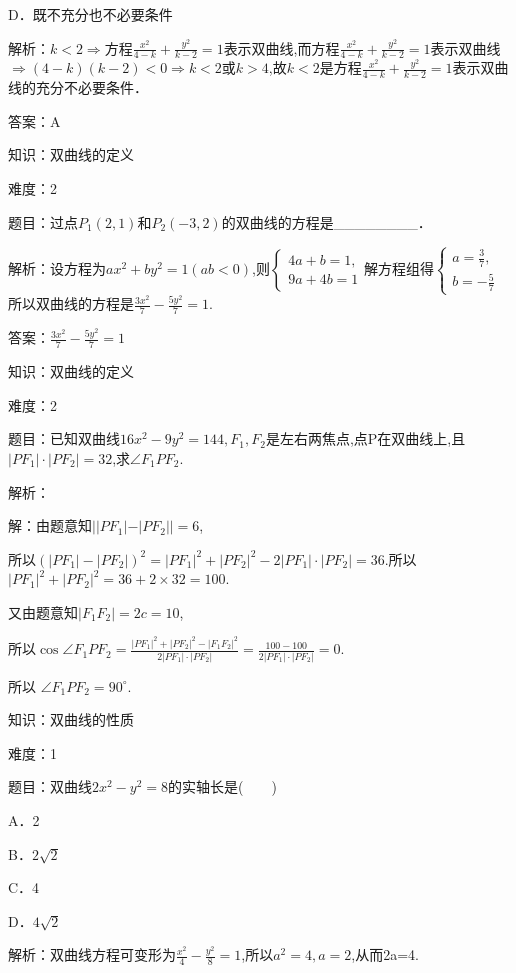 \documentclass{article} %
\begin{document}
D．既不充分也不必要条件

解析：$k<2 \Rightarrow $方程$\frac{x^2}{4-k}+\frac{y^2}{k-2}=1$表示双曲线,而方程$\frac{x^2}{4-k}+\frac{y^2}{k-2}=1$表示双曲线$\Rightarrow (4-k)(k-2)<0 \Rightarrow k<2$或$k>4$,故$k<2$是方程$\frac{x^2}{4-k}+\frac{y^2}{k-2}=1$表示双曲线的充分不必要条件．

答案：A



知识：双曲线的定义

难度：2

题目：过点$P_{1}(2,1)$和$P_{2}(-3,2)$的双曲线的方程是\_\_\_\_\_\_\_\_．

解析：设方程为$ax^{2}+by^{2}=1(ab<0)$,则$\left\{
\begin{array}{l}
4a+b=1, \\
9a+4b=1
\end{array}
\right.$解方程组得$\left\{
\begin{array}{l}
a=\frac{3}{7}, \\
b=-\frac{5}{7}
\end{array}
\right.$所以双曲线的方程是$\frac{3x^2}{7}-\frac{5y^2}{7}=1$.

答案：$\frac{3x^2}{7}-\frac{5y^2}{7}=1$

知识：双曲线的定义

难度：2

题目：已知双曲线$16x^{2}-9y^{2}=144,F_{1},F_{2}$是左右两焦点,点P在双曲线上,且$|PF_1|\cdot |PF_2|=32$,求${\angle}F_{1}PF_{2}$.

解析：

解：由题意知$||PF_1|-|PF_2||=6$,

所以$(|PF_1|-|PF_2|)^2=|PF_1|^2+|PF_2|^2-2|PF_1|\cdot |PF_2|=36$.所以$|PF_1|^2+|PF_2|^2=36+2\times 32=100$.

又由题意知$|F_1F_2|=2c=10$,

所以$\cos \angle F_1PF_2 =\frac{|PF_1|^2+|PF_2|^2-|F_1F_2|^2}{2|PF_1|\cdot |PF_2|}=\frac{100-100}{2|PF_1|\cdot |PF_2|}=0$.

所以 ${\angle}F_{1}PF_{2}=90^{\circ}$.



知识：双曲线的性质

难度：1

题目：双曲线$2x^{2}-y^{2}=8$的实轴长是(　　)

A．2  

B．$2\sqrt{2}$  

C．4  

D．$4\sqrt{2}$

解析：双曲线方程可变形为$\frac{x^2}{4}-\frac{y^2}{8}=1$,所以$a^{2}=4,a=2$,从而2a=4.
\end{document}
